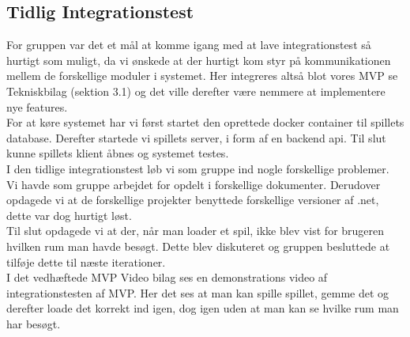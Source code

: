 \subsection{Tidlig Integrationstest}
For gruppen var det et mål at komme igang med at lave integrationstest så hurtigt som muligt, da vi ønskede at der hurtigt kom styr på kommunikationen mellem de forskellige moduler i systemet. Her integreres altså blot vores MVP se Tekniskbilag (sektion 3.1) og det ville derefter være nemmere at implementere nye features.\\

\noindent For at køre systemet har vi først startet den oprettede docker container til spillets database. Derefter startede vi spillets server, i form af en backend api. Til slut kunne spillets klient åbnes og systemet testes.\\

\noindent I den tidlige integrationstest løb vi som gruppe ind nogle forskellige problemer.\\
Vi havde som gruppe arbejdet for opdelt i forskellige dokumenter. 
Derudover opdagede vi at de forskellige projekter benyttede forskellige versioner af .net, dette var dog hurtigt løst.\\
Til slut opdagede vi at der, når man loader et spil, ikke blev vist for brugeren hvilken rum man havde besøgt. Dette blev diskuteret og gruppen besluttede at tilføje dette til næste iterationer.\\

\noindent I det vedhæftede MVP Video bilag ses en demonstrations video af integrationstesten af MVP. Her det ses at man kan spille spillet, gemme det og derefter loade det korrekt ind igen, dog igen uden at man kan se hvilke rum man har besøgt.
